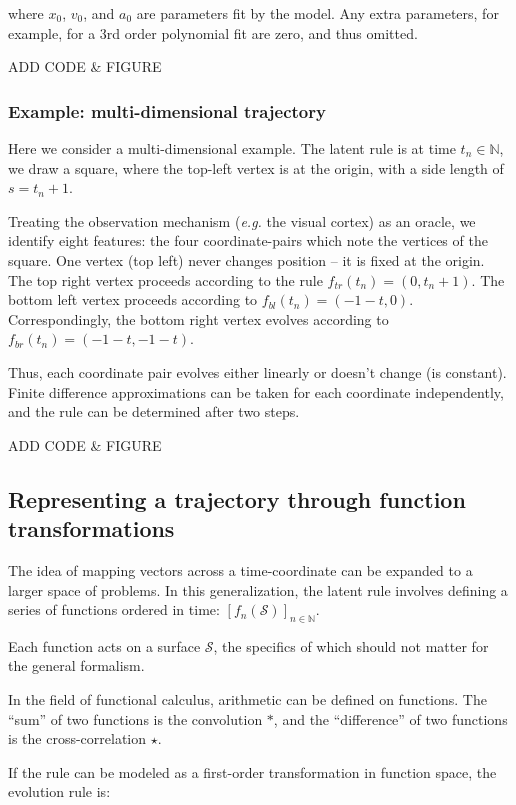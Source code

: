 \documentclass{article}
\begin{document}
where $x_0$, $v_0$, and $a_0$ are parameters fit by the model.
Any extra parameters, for example, for a 3rd order polynomial fit are zero, and thus omitted.

ADD CODE \& FIGURE

\subsubsection{Example: multi-dimensional trajectory}

Here we consider a multi-dimensional example.
The latent rule is at time $t_n \in \mathbb{N}$, we draw a square,
where the top-left vertex is at the origin,
with a side length of $s = t_n + 1$.

Treating the observation mechanism (\textit{e.g.} the visual cortex) as an oracle,
we identify eight features: the four coordinate-pairs which note the vertices of the square.
One vertex (top left) never changes position -- it is fixed at the origin.
The top right vertex proceeds according to the rule $f_{tr}(t_n) = (0, t_n + 1)$.
The bottom left vertex proceeds according to $f_{bl}(t_n) = (-1 - t, 0)$.
Correspondingly, the bottom right vertex evolves according to $f_{br}(t_n) = (-1 -t, -1 -t)$.

Thus, each coordinate pair evolves either linearly or doesn't change (is constant).
Finite difference approximations can be taken for each coordinate independently,
and the rule can be determined after two steps.

ADD CODE \& FIGURE

\subsection{Representing a trajectory through function transformations}

The idea of mapping vectors across a time-coordinate can be expanded to a larger space of problems.
In this generalization, the latent rule involves defining a series of functions ordered in time:
$ \left[ f_n(\mathcal{S})\right]_{n \in \mathbb{N}}$.

Each function acts on a surface $\mathcal{S}$,
the specifics of which should not matter for the general formalism.

In the field of functional calculus, arithmetic can be defined on functions.
The ``sum'' of two functions is the convolution $*$, and the ``difference''
of two functions is the cross-correlation $\star$.

If the rule can be modeled as a first-order transformation in function space,
the evolution rule is:
\end{document}
